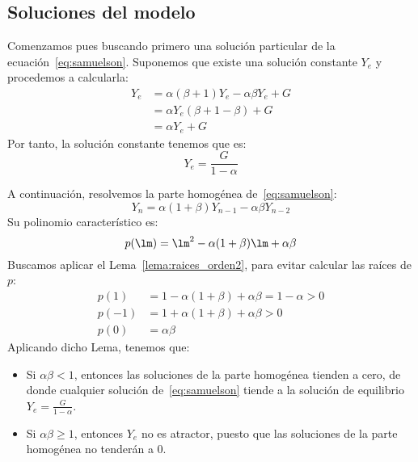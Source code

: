 \subsection{Soluciones del modelo}
Comenzamos pues buscando primero una solución particular de la ecuación~\ref{eq:samuelson}. Suponemos que existe una solución constante $Y_e$ y procedemos a calcularla:
\begin{align*}
    Y_e &= \alpha(\beta +1)Y_e - \alpha\beta Y_e + G \\
        &= \alpha Y_e (\beta + 1 -\beta) + G \\
        &= \alpha Y_e + G
\end{align*}
Por tanto, la solución constante tenemos que es:
\begin{equation*}
    Y_e = \dfrac{G}{1-\alpha}
\end{equation*}

A continuación, resolvemos la parte homogénea de~\ref{eq:samuelson}:
\begin{equation*}
    Y_n = \alpha(1+\beta)Y_{n-1} - \alpha\beta Y_{n-2}
\end{equation*}
Su polinomio característico es:
\begin{equation*}
    p(\lm) = \lm^2 - \alpha(1+\beta)\lm + \alpha\beta
\end{equation*}
Buscamos aplicar el Lema~\ref{lema:raices_orden2}, para evitar calcular las raíces de $p$:
\begin{align*}
    p(1) &=  1-\alpha(1+\beta) + \alpha\beta = 1 - \alpha > 0\\
    p(-1) &= 1 + \alpha(1+\beta)+\alpha\beta > 0 \\
    p(0) &= \alpha\beta
\end{align*}
Aplicando dicho Lema, tenemos que:
\begin{itemize}
    \item Si $\alpha\beta < 1$, entonces las soluciones de la parte homogénea tienden a cero, de donde cualquier solución de~\ref{eq:samuelson} tiende a la solución de equilibrio $Y_e = \frac{G}{1-\alpha}$.
    \item Si $\alpha\beta \geq 1$, entonces $Y_e$ no es atractor, puesto que las soluciones de la parte homogénea no tenderán a $0$.
\end{itemize}